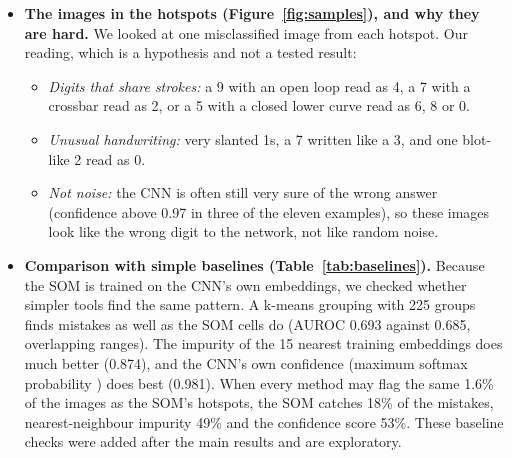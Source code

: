 \documentclass[11pt]{article}
\begin{document}
\begin{itemize}[leftmargin=1.4em, itemsep=2pt]
\item \textbf{The images in the hotspots (Figure~\ref{fig:samples}), and why they are hard.} We looked at one misclassified image from each hotspot. Our reading, which is a hypothesis and not a tested result:
  \begin{itemize}[leftmargin=1.2em, itemsep=0pt]
  \item \emph{Digits that share strokes:} a 9 with an open loop read as 4, a 7 with a crossbar read as 2, or a 5 with a closed lower curve read as 6, 8 or 0.
  \item \emph{Unusual handwriting:} very slanted 1s, a 7 written like a 3, and one blot-like 2 read as 0.
  \item \emph{Not noise:} the CNN is often still very sure of the wrong answer (confidence above 0.97 in three of the eleven examples), so these images look like the wrong digit to the network, not like random noise.
  \end{itemize}

\item \textbf{Comparison with simple baselines (Table~\ref{tab:baselines}).} Because the SOM is trained on the CNN's own embeddings, we checked whether simpler tools find the same pattern. A k-means grouping with 225 groups finds mistakes as well as the SOM cells do (AUROC 0.693 against 0.685, overlapping ranges). The impurity of the 15 nearest training embeddings does much better (0.874), and the CNN's own confidence (maximum softmax probability \cite{hendrycks2017baseline}) does best (0.981). When every method may flag the same 1.6\% of the images as the SOM's hotspots, the SOM catches 18\% of the mistakes, nearest-neighbour impurity 49\% and the confidence score 53\%. These baseline checks were added after the main results and are exploratory.
\end{itemize}
\end{document}
